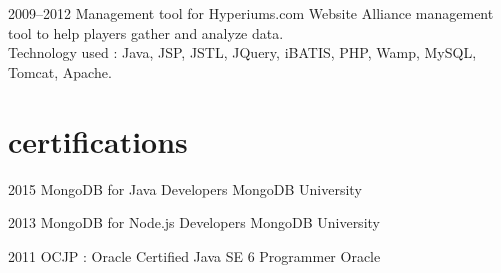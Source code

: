 \documentclass[]{friggeri-cv} %
\begin{document}
\begin{entrylist}

\entry
{2009--2012}
{Management tool for Hyperiums.com}
{Website}
{}
{Alliance management tool to help players gather and analyze data.\\
Technology used : Java, JSP, JSTL, JQuery, iBATIS, PHP, Wamp, MySQL, Tomcat, Apache.}

\end{entrylist}


\section{certifications}

\begin{entrylist}


\entry
{2015}
{MongoDB for Java Developers}
{MongoDB University}
{}
{}

\entry
{2013}
{MongoDB for Node.js Developers}
{MongoDB University}
{}
{}

\entry
{2011}
{OCJP : Oracle Certified Java SE 6 Programmer}
{Oracle}
{}
{}


\end{entrylist}



\end{document}

